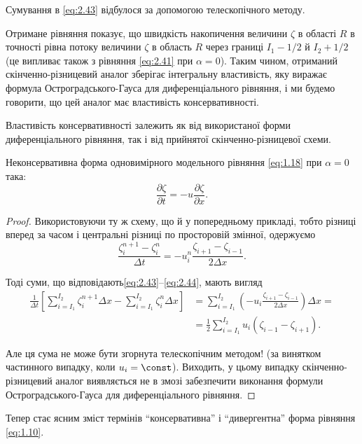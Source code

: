 \begin{remark}
    Сумування в \eqref{eq:2.43} відбулося за допомогою телескопічного методу.
\end{remark}
 
Отримане рівняння показує, що швидкість накопичення величини $\zeta$ в області $R$ в точності рівна потоку величини $\zeta$ в область $R$ через границі $I_1 - 1/2$ й $I_2 + 1/2$ (це випливає також з рівняння \eqref{eq:2.41} при $\alpha = 0$). Таким чином, отриманий скінченно-різницевий аналог зберігає інтегральну властивість, яку виражає формула Остроградського-Гауса для диференціального рівняння, і ми будемо говорити, що цей аналог має властивість консервативності. \medskip

Властивість консервативності залежить як від використаної форми диференціального рівняння, так і від прийнятої скінченно-різницевої схеми. 

\begin{example}
    Неконсервативна форма одновимірного модельного рівняння \eqref{eq:1.18} при $\alpha = 0$ така:
    \begin{equation}
        \label{eq:2.45}
        \frac{\partial \zeta}{\partial t} = - u \frac{\partial \zeta}{\partial x}.
    \end{equation}
\end{example}
\begin{proof}
    Використовуючи ту ж схему, що й у попередньому прикладі, тобто різниці вперед за часом і центральні різниці по просторовій змінної, одержуємо
    \begin{equation}
        \label{eq:2.46}
        \frac{\zeta_i^{n + 1} - \zeta_i^n}{\Delta t} = - u_i^n \frac{\zeta_{i + 1} - \zeta_{i - 1}}{2 \Delta x}.
    \end{equation}

    Тоді суми, що відповідають\eqref{eq:2.43}--\eqref{eq:2.44}, мають вигляд
    \begin{equation}
        \label{eq:2.47}
        \begin{aligned}
            \frac{1}{\Delta t} \left[ \sum_{i = I_1}^{I_2} \zeta_i^{n + 1} \Delta x - \sum_{i = I_1}^{I_2} \zeta_i^n \Delta x \right] &= \sum_{i = I_1}^{I_2} \left( - u_i \frac{\zeta_{i + 1} - \zeta_{i - 1}}{2 \Delta x} \right) \Delta x = \\
            &= \frac{1}{2} \sum_{i = I_1}^{I_2} u_i (\zeta_{i - 1} - \zeta_{i + 1}).
        \end{aligned}
    \end{equation}
    
    Але ця сума не може бути згорнута телескопічним методом! (за винятком частинного випадку, коли $u_i = \const$). Виходить, у цьому випадку скінченно-різницевий аналог виявляється не в змозі забезпечити виконання формули Остроградського-Гауса для диференціального рівняння. 
\end{proof}
\begin{remark}
    Тепер стає ясним зміст термінів ``консервативна'' і ``дивергентна'' форма рівняння \eqref{eq:1.10}.
\end{remark}

